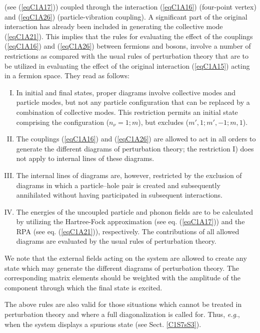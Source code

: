 (see (\ref{eqC1A17})) coupled through the interaction (\ref{eqC1A16}) (four-point vertex) and (\ref{eqC1A26}) (particle-vibration coupling). A significant
part of the original interaction has already been included in generating the
collective mode (\ref{eqC1A21}). This implies that the rules for evaluating the effect of
the couplings (\ref{eqC1A16}) and (\ref{eqC1A26}) between fermions and bosons, involve a number of restrictions as compared with the usual rules of perturbation theory that
are to be utilized in evaluating the effect of the original interaction (\ref{eqC1A15}) acting
in a fermion space. They read as follows:
\begin{enumerate}[I)]
\item In initial and final states, proper diagrams involve collective modes
and particle modes, but not any particle configuration that can be replaced by
a combination of collective modes. This restriction permits an initial state
comprising the configuration ($n_\nu =1;m$), but excludes ($m', 1; m',-1; m,1$).
\item The couplings (\ref{eqC1A16}) and (\ref{eqC1A26}) are allowed to act in all orders to
generate the different diagrams of perturbation theory; the restriction I) does
not apply to internal lines of these diagrams.
\item The internal lines of diagrams are, however, restricted by the exclusion of diagrams in which a particle--hole pair is created and subsequently
annihilated without having participated in subsequent interactions.
\item The energies of the uncoupled particle and phonon fields are to be
calculated by utilizing the Hartree-Fock approximation (see eq. (\ref{eqC1A17})) and the
RPA (see eq. (\ref{eqC1A21})), respectively. The contributions of all allowed diagrams are
evaluated by the usual rules of perturbation theory.
\end{enumerate}

We note that the external fields acting on the system are allowed to create
any state which may generate the different diagrams of perturbation theory.
The corresponding matrix elements should be weighted with the amplitude of
the component through which the final state is excited.



The above rules are also valid for those situations which cannot be treated
in perturbation theory and where a full diagonalization is called for. Thus,
\textit{e.g}., when the system displays a spurious state (see Sect. \ref{C1S7sS3}).



